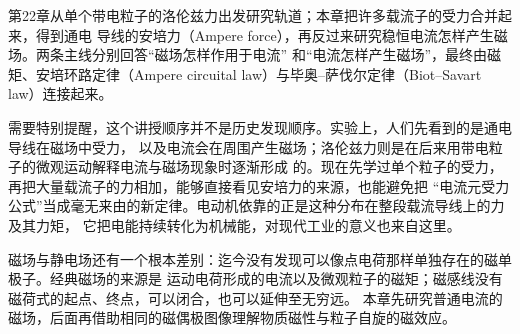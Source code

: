 {\newcommand{\chargeMonopoleComparison}{%
\begin{center}\begin{tikzpicture}[scale=.65,>=Latex]
 \foreach \yy/\f/\signa/\signb in {2.6/E/+/-, -2.6/B/N/S}{
  \foreach \xx/\sg/\dr in {0/\signa/1,4.5/\signb/-1}{
   \begin{scope}[shift={(\xx,\yy)}]
    \draw[Ink](0,0)circle(.32);\node at(0,0){$\sg$};
    \foreach \a in {0,45,...,315}{\ifnum\dr=1
     \draw[DeepBlue,->](\a:.42)--(\a:1.45);
     \else\draw[DeepBlue,->](\a:1.45)--(\a:.42);\fi}
    \node[above]at(0,1.65){$\vect\f$};
   \end{scope}}
  \begin{scope}[shift={(9.6,\yy)}]
   \draw[vector](-1.6,0)--(1.9,0)node[right]{$\vect v$};
   \node[above]at(0,1.55){\ifdim\yy pt>0pt 正电荷\else 假想正磁荷\fi};
   \foreach \x in {-.9,0,.9}{
    \draw[DeepBlue,dashed] (\x,1.35)arc(90:270:.23 and 1.35);
    \ifdim\yy pt>0pt
     \draw[DeepBlue,->](\x,1.35)arc(90:-90:.23 and 1.35);
    \else
     \draw[DeepBlue,->](\x,-1.35)arc(270:450:.23 and 1.35);
    \fi}
   \node[below]at(0,-1.6){\ifdim\yy pt>0pt 环绕的磁场 $\vect B$\else 假想环绕电场 $\vect E$\fi};
  \end{scope}}
 \node[align=center]at(4.8,-5.8){下排仅是假设磁荷存在的类比；普通磁铁的N、S极不是孤立磁荷。};
\end{tikzpicture}\end{center}}


第22章从单个带电粒子的洛伦兹力出发研究轨道；本章把许多载流子的受力合并起来，得到通电
导线的安培力（Ampere force），再反过来研究稳恒电流怎样产生磁场。两条主线分别回答“磁场怎样作用于电流”
和“电流怎样产生磁场”，最终由磁矩、安培环路定律（Ampere circuital law）与毕奥--萨伐尔定律（Biot--Savart law）连接起来。

需要特别提醒，这个讲授顺序并不是历史发现顺序。实验上，人们先看到的是通电导线在磁场中受力，
以及电流会在周围产生磁场；洛伦兹力则是在后来用带电粒子的微观运动解释电流与磁场现象时逐渐形成
的。现在先学过单个粒子的受力，再把大量载流子的力相加，能够直接看见安培力的来源，也能避免把
“电流元受力公式”当成毫无来由的新定律。电动机依靠的正是这种分布在整段载流导线上的力及其力矩，
它把电能持续转化为机械能，对现代工业的意义也来自这里。

磁场与静电场还有一个根本差别：迄今没有发现可以像点电荷那样单独存在的磁单极子。经典磁场的来源是
运动电荷形成的电流以及微观粒子的磁矩；磁感线没有磁荷式的起点、终点，可以闭合，也可以延伸至无穷远。
本章先研究普通电流的磁场，后面再借助相同的磁偶极图像理解物质磁性与粒子自旋的磁效应。

}
